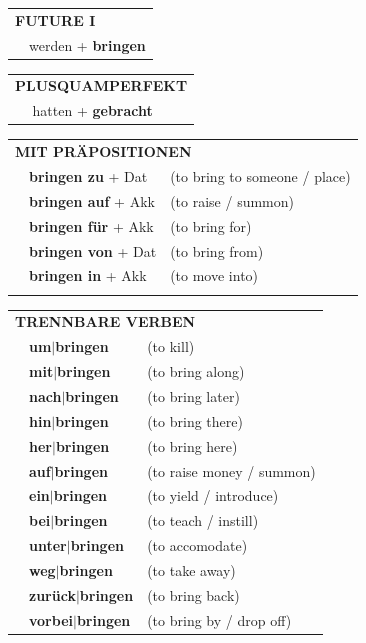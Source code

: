 \documentclass[10pt,a4paper]{revtex4-2}
\begin{document}
\begin{verbbox-acc}
\begin{tabular}{rl}
    \multicolumn{2}{l}{\textbf{FUTURE I} }\\
  &  werden + \textbf{bringen}\\
 
  \end{tabular}
\hfill
   \begin{tabular}{rl}
      \multicolumn{2}{l}{\textbf{PLUSQUAMPERFEKT}}\\
   & hatten + \textbf{gebracht}\\
  \end{tabular}

  
  \vspace{10pt}

   \begin{tabular}{lll}
      \multicolumn{3}{l}{\textbf{MIT PRÄPOSITIONEN}}\\
& \textbf{bringen zu} + Dat & (to bring to someone / place)\\
&\textbf{bringen auf} + Akk & (to raise / summon)\\
&\textbf{bringen für} + Akk & (to bring for)\\
&\textbf{bringen von} + Dat & (to bring from)\\
&\textbf{bringen in} + Akk & (to move into)\\
\vspace{70pt}
  \end{tabular}
  \hfill
   \begin{tabular}{lll}
      \multicolumn{3}{l}{\textbf{TRENNBARE VERBEN}}\\
 & \textbf{um$|$bringen} & (to kill)\\
 & \textbf{mit$|$bringen} & (to bring along)\\
  & \textbf{nach$|$bringen} & (to bring later)\\
  & \textbf{hin$|$bringen} & (to bring there)\\
  & \textbf{her$|$bringen} & (to bring here)\\
     & \textbf{auf$|$bringen} & (to raise money / summon)\\
     & \textbf{ein$|$bringen} & (to yield / introduce)\\
     & \textbf{bei$|$bringen} & (to teach / instill)\\
     & \textbf{unter$|$bringen} & (to accomodate)\\
     & \textbf{weg$|$bringen} & (to take away)\\
      & \textbf{zurück$|$bringen} & (to bring back)\\

      & \textbf{vorbei$|$bringen} & (to bring by / drop off)\\
  \end{tabular}


  \vspace{-5pt}

\end{verbbox-acc}
\end{document}
